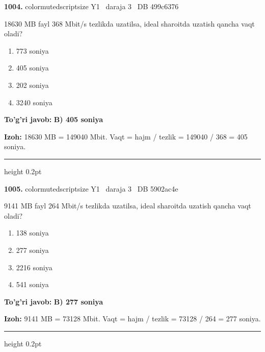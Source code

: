\documentclass[10pt,a4paper,oneside]{article}
\begin{document}
\noindent\textbf{\color{ink}1004.}  {color{muted}scriptsize Y1 \textbullet\ daraja 3 \textbullet\ DB 499c6376}
\par
18630 MB fayl 368 Mbit/s tezlikda uzatilsa, ideal sharoitda uzatish qancha vaqt oladi?
\begin{enumerate}[label=\Alph*),leftmargin=9mm]
\item 773 soniya
\item 405 soniya
\item 202 soniya
\item 3240 soniya
\end{enumerate}
\begin{tcolorbox}[enhanced,breakable,colback=teal!4,colframe=teal!50!black,boxrule=0.5pt,arc=1.1mm,left=3mm,right=3mm,top=1.7mm,bottom=1.7mm,before skip=2mm,after skip=2mm]
\textbf{\color{teal}To'g'ri javob:} \textbf{B) 405 soniya}
\par\smallskip
\textbf{Izoh:} 18630 MB = 149040 Mbit. Vaqt = hajm / tezlik = 149040 / 368 = 405 soniya.
\end{tcolorbox}
\vspace{2mm}\hrule height 0.2pt \vspace{3mm}

\noindent\textbf{\color{ink}1005.}  {color{muted}scriptsize Y1 \textbullet\ daraja 3 \textbullet\ DB 5902ac4e}
\par
9141 MB fayl 264 Mbit/s tezlikda uzatilsa, ideal sharoitda uzatish qancha vaqt oladi?
\begin{enumerate}[label=\Alph*),leftmargin=9mm]
\item 138 soniya
\item 277 soniya
\item 2216 soniya
\item 541 soniya
\end{enumerate}
\begin{tcolorbox}[enhanced,breakable,colback=teal!4,colframe=teal!50!black,boxrule=0.5pt,arc=1.1mm,left=3mm,right=3mm,top=1.7mm,bottom=1.7mm,before skip=2mm,after skip=2mm]
\textbf{\color{teal}To'g'ri javob:} \textbf{B) 277 soniya}
\par\smallskip
\textbf{Izoh:} 9141 MB = 73128 Mbit. Vaqt = hajm / tezlik = 73128 / 264 = 277 soniya.
\end{tcolorbox}
\vspace{2mm}\hrule height 0.2pt \vspace{3mm}
\end{document}
